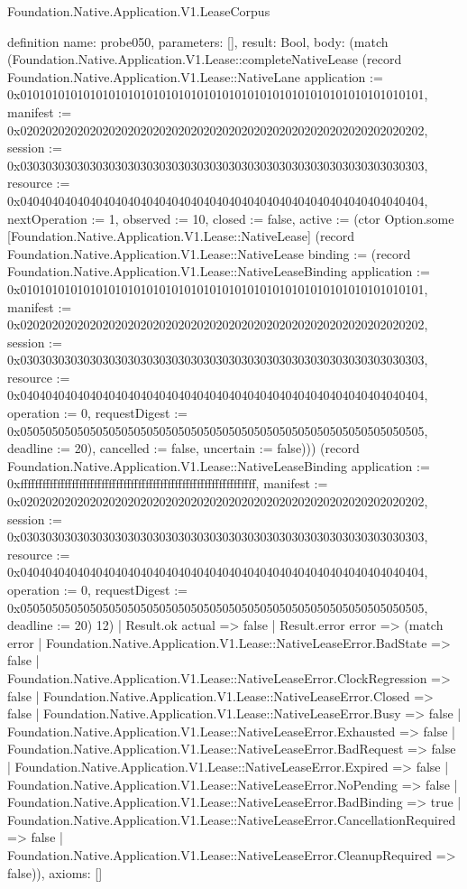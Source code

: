 \begin{lexlean}{Foundation.Native.Application.V1.LeaseCorpus}
\begin{semanticmodule}
definition{
  name: probe050,
  parameters: [],
  result: Bool,
  body: (match (Foundation.Native.Application.V1.Lease::completeNativeLease (record Foundation.Native.Application.V1.Lease::NativeLane {application := 0x0101010101010101010101010101010101010101010101010101010101010101, manifest := 0x0202020202020202020202020202020202020202020202020202020202020202, session := 0x0303030303030303030303030303030303030303030303030303030303030303, resource := 0x0404040404040404040404040404040404040404040404040404040404040404, nextOperation := 1, observed := 10, closed := false, active := (ctor Option.some [Foundation.Native.Application.V1.Lease::NativeLease] (record Foundation.Native.Application.V1.Lease::NativeLease {binding := (record Foundation.Native.Application.V1.Lease::NativeLeaseBinding {application := 0x0101010101010101010101010101010101010101010101010101010101010101, manifest := 0x0202020202020202020202020202020202020202020202020202020202020202, session := 0x0303030303030303030303030303030303030303030303030303030303030303, resource := 0x0404040404040404040404040404040404040404040404040404040404040404, operation := 0, requestDigest := 0x0505050505050505050505050505050505050505050505050505050505050505, deadline := 20}), cancelled := false, uncertain := false}))}) (record Foundation.Native.Application.V1.Lease::NativeLeaseBinding {application := 0xffffffffffffffffffffffffffffffffffffffffffffffffffffffffffffffff, manifest := 0x0202020202020202020202020202020202020202020202020202020202020202, session := 0x0303030303030303030303030303030303030303030303030303030303030303, resource := 0x0404040404040404040404040404040404040404040404040404040404040404, operation := 0, requestDigest := 0x0505050505050505050505050505050505050505050505050505050505050505, deadline := 20}) 12)
    | Result.ok actual => false
    | Result.error error => (match error
      | Foundation.Native.Application.V1.Lease::NativeLeaseError.BadState => false
      | Foundation.Native.Application.V1.Lease::NativeLeaseError.ClockRegression => false
      | Foundation.Native.Application.V1.Lease::NativeLeaseError.Closed => false
      | Foundation.Native.Application.V1.Lease::NativeLeaseError.Busy => false
      | Foundation.Native.Application.V1.Lease::NativeLeaseError.Exhausted => false
      | Foundation.Native.Application.V1.Lease::NativeLeaseError.BadRequest => false
      | Foundation.Native.Application.V1.Lease::NativeLeaseError.Expired => false
      | Foundation.Native.Application.V1.Lease::NativeLeaseError.NoPending => false
      | Foundation.Native.Application.V1.Lease::NativeLeaseError.BadBinding => true
      | Foundation.Native.Application.V1.Lease::NativeLeaseError.CancellationRequired => false
      | Foundation.Native.Application.V1.Lease::NativeLeaseError.CleanupRequired => false)),
  axioms: []
}


\end{semanticmodule}
\end{lexlean}
